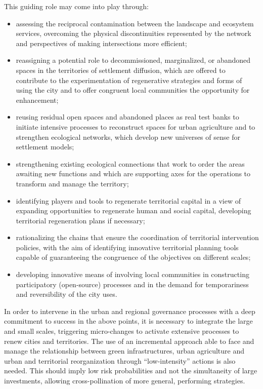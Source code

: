 \documentclass[10pt,a4paper]{article}
\begin{document}
\begin{multicols}{2}
This guiding role may come into play through:

\begin{itemize}
	\item assessing the reciprocal contamination between the landscape and ecosystem services, overcoming the physical discontinuities represented by the network and perspectives of making intersections more efficient;
	\item reassigning a potential role to decommissioned, marginalized, or abandoned spaces in the territories of settlement diffusion, which are offered to contribute to the experimentation of regenerative strategies and forms of using the city and to offer congruent local communities the opportunity for enhancement;
	\item reusing residual open spaces and abandoned places as real test banks to initiate intensive processes to reconstruct spaces for urban agriculture and to strengthen ecological networks, which develop new universes of sense for settlement models;
	\item strengthening existing ecological connections that work to order the areas awaiting new functions and which are supporting axes for the operations to transform and manage the territory;
	\item identifying players and tools to regenerate territorial capital in a view of expanding opportunities to regenerate human and social capital, developing territorial regeneration plans if necessary;
	\item rationalizing the chains that ensure the coordination of territorial intervention policies, with the aim of identifying innovative territorial planning tools capable of guaranteeing the congruence of the objectives on different scales;
	\item developing innovative means of involving local communities in constructing participatory (open-source) processes and in the demand for temporariness and reversibility of the city uses.
\end{itemize}

In order to intervene in the urban and regional governance processes with a deep commitment to success in the above points, it is necessary to integrate the large and small scales, triggering micro-changes to activate extensive processes to renew cities and territories. The use of an incremental approach able to face and manage the relationship between green infrastructures, urban agriculture and urban and territorial reorganization through ``low-intensity'' actions is also needed. This should imply low risk probabilities and not the simultaneity of large investments, allowing cross-pollination of more general, performing strategies.


\end{multicols}
\end{document}
